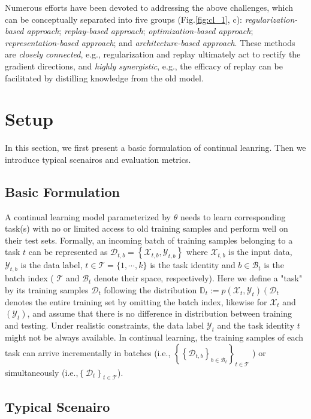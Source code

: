 Numerous efforts have been devoted to addressing the above challenges, which can be conceptually separated into five groups (Fig.\ref{fig:cl_1}, c): \textit{regularization-based approach}; \textit{replay-based approach}; \textit{optimization-based approach}; \textit{representation-based approach}; and \textit{architecture-based approach}. These methods are \textit{closely connected}, e.g., regularization and replay ultimately act to rectify the gradient directions, and \textit{highly synergistic}, e.g., the efficacy of replay can be facilitated by distilling knowledge from the old model.

\section{Setup}
In this section, we first present a basic formulation of continual leanring. Then we introduce typical scenairos and evaluation metrics.

\subsection{Basic Formulation}
A continual learning model parameterized by \(\theta\) needs to learn corresponding task(s) with no or limited access to old training samples and perform well on their test sets. Formally, an incoming batch of training samples belonging to a task \(t\) can be represented as \(\mathcal{D}_{t, b}=\left\{\mathcal{X}_{t, b}, \mathcal{Y}_{t, b}\right\}\) where \(\mathcal{X}_{t, b}\) is the input data, \(\mathcal{Y}_{t, b}\) is the data label, \(t \in \mathcal{T}=\{1, \cdots, k\}\) is the task identity and \(b \in \mathcal{B}_{t}\) is the batch index ( \(\mathcal{T}\) and \(\mathcal{B}_{t}\) denote their space, respectively). Here we define a "task" by its training samples \(\mathcal{D}_{t}\) following the distribution \(\mathbb{D}_{t}:=p\left(\mathcal{X}_{t}, \mathcal{Y}_{t}\right)\left(\mathcal{D}_{t}\right.\) denotes the entire training set by omitting the batch index, likewise for \(\mathcal{X}_{t}\) and \(\left( \mathcal{Y}_{t}\right)\), and assume that there is no difference in distribution between training and testing. Under realistic constraints, the data label \(\mathcal{Y}_{t}\) and the task identity \(t\) might not be always available. In continual learning, the training samples of each task can arrive incrementally in batches (i.e., \(\left\{\left\{\mathcal{D}_{t, b}\right\}_{b \in \mathcal{B}_{t}}\right\}_{t \in \mathcal{T}}\) ) or simultaneously (i.e.,\(\left\{\mathcal{D}_{t}\right\}_{t \in \mathcal{T}}\)).

\subsection{Typical Scenairo}